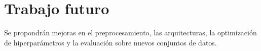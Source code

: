 \section{Trabajo futuro}

Se propondrán mejoras en el preprocesamiento, las arquitecturas, la optimización de hiperparámetros y la evaluación sobre nuevos conjuntos de datos.
